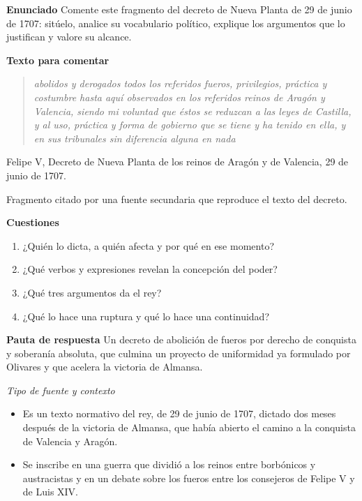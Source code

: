 \documentclass{book}
\begin{document}
\begin{tcolorbox}[title={Ejercicio resuelto}, studiumworked, breakable]

\noindent\textbf{Enunciado}
Comente este fragmento del decreto de Nueva Planta de 29 de junio de 1707: sitúelo, analice su vocabulario político, explique los argumentos que lo justifican y valore su alcance.


\noindent\textbf{Texto para comentar}

\begin{quote}
\itshape abolidos y derogados todos los referidos fueros, privilegios, práctica y costumbre hasta aquí observados en los referidos reinos de Aragón y Valencia, siendo mi voluntad que éstos se reduzcan a las leyes de Castilla, y al uso, práctica y forma de gobierno que se tiene y ha tenido en ella, y en sus tribunales sin diferencia alguna en nada
\end{quote}
{\noindent\footnotesize Felipe V, Decreto de Nueva Planta de los reinos de Aragón y de Valencia, 29 de junio de 1707.\par}
{\noindent\footnotesize Fragmento citado por una fuente secundaria que reproduce el texto del decreto.\par}

\noindent\textbf{Cuestiones}
\begin{enumerate}
\item ¿Quién lo dicta, a quién afecta y por qué en ese momento?
\item ¿Qué verbos y expresiones revelan la concepción del poder?
\item ¿Qué tres argumentos da el rey?
\item ¿Qué lo hace una ruptura y qué lo hace una continuidad?
\end{enumerate}

\noindent\textbf{Pauta de respuesta}
Un decreto de abolición de fueros por derecho de conquista y soberanía absoluta, que culmina un proyecto de uniformidad ya formulado por Olivares y que acelera la victoria de Almansa.


\noindent\textit{Tipo de fuente y contexto}
\begin{itemize}
\item Es un texto normativo del rey, de 29 de junio de 1707, dictado dos meses después de la victoria de Almansa, que había abierto el camino a la conquista de Valencia y Aragón.
\item Se inscribe en una guerra que dividió a los reinos entre borbónicos y austracistas y en un debate sobre los fueros entre los consejeros de Felipe V y de Luis XIV.
\end{itemize}


\end{tcolorbox}
\end{document}
